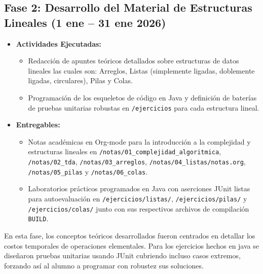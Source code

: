 \documentclass[12 pt]{article}
\begin{document}
\subsection*{Fase 2: Desarrollo del Material de Estructuras Lineales (1 ene – 31 ene 2026)}
\begin{itemize}
    \item \textbf{Actividades Ejecutadas:}
    \begin{itemize}
        \item Redacción de apuntes teóricos detallados sobre estructuras de datos lineales las cuales son: Arreglos, Listas (simplemente ligadas, doblemente ligadas, circulares), Pilas y Colas.
        \item Programación de los esqueletos de código en Java y definición de baterías de pruebas unitarias robustas en \texttt{/ejercicios} para cada estructura lineal.
    \end{itemize}
    \item \textbf{Entregables:} 
    \begin{itemize}
        \item Notas académicas en Org-mode para la introducción a la complejidad y estructuras lineales en \texttt{/notas/01\_complejidad\_algoritmica}, \texttt{/notas/02\_tda}, \texttt{/notas/03\_arreglos}, \texttt{/notas/04\_listas/notas.org}, \texttt{/notas/05\_pilas} y \texttt{/notas/06\_colas}.
        \item Laboratorios prácticos programados en Java con aserciones JUnit listas para autoevaluación en \texttt{/ejercicios/listas/}, \texttt{/ejercicios/pilas/} y \texttt{/ejercicios/colas/} junto con sus respectivos archivos de compilación \texttt{BUILD}.
    \end{itemize}
\end{itemize}

En esta fase, los conceptos teóricos desarrollados fueron centrados en detallar los costos temporales de operaciones elementales. Para los ejercicios hechos en java se diseñaron pruebas unitarias usando JUnit cubriendo incluso casos extremos, forzando así al alumno a programar con robustez sus soluciones.
\end{document}
